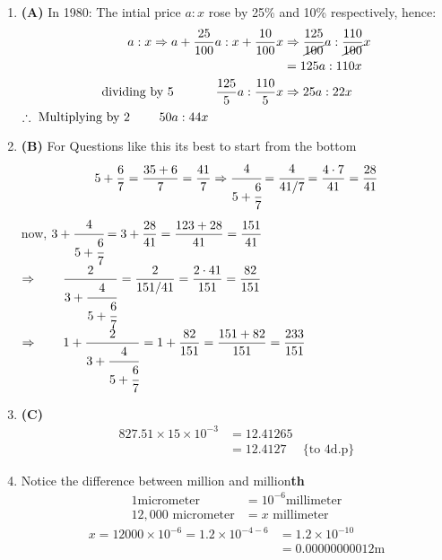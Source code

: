\begin{multicols}{2}
\begin{enumerate}[label={\textbf{\arabic*.}}]
    \item \textbf{(A)} In 1980: The intial price \(a : x\) rose by 25\% and 10\% respectively, hence: 
        \begin{align*}
        a:x \Rightarrow  a + \dfrac{25}{100}a : x + \dfrac{10}{100}x &\Rightarrow \dfrac{125}{\cancel{100}}a : \dfrac{110}{\cancel{100}}x \\ 
        &= {125}a : 110x \\
        \text{dividing by 5 } \hspace{30px} \dfrac{125}{5} a : \dfrac{110}{5} x  &\Rightarrow 25a : 22x 
    \end{align*}
    \(\therefore \text{ Multiplying by 2 } \hspace{20px}  50a : 44x \)

    \item \textbf{(B)} For Questions like this its best to start from the bottom \\
    \[5 + \dfrac{6}{7} = \dfrac{35 + 6}{7} = \dfrac{41}{7} \Rightarrow \cfrac{4}{5 + \cfrac{6}{7}} = \cfrac{4}{41/7} = \dfrac{4 \cdot 7}{41} = \dfrac{28}{41}\]
    now, \(3 + \cfrac{4}{5 + \cfrac{6}{7}} = 3 + \dfrac{28}{41} = \dfrac{123 + 28}{41} = \dfrac{151}{41} \)  \vspace{10pt} \\
    \(\Rightarrow \hspace{20px} \dfrac{2}{3 + \cfrac{4}{5 + \cfrac{6}{7}}} = \dfrac{2}{151/41} = \dfrac{2 \cdot 41}{151} = \dfrac{82}{151} \) \vspace{10pt} \\
    \(\Rightarrow \hspace{20px} 1 + \dfrac{2}{3 + \cfrac{4}{5 + \cfrac{6}{7}}} = 1 + \dfrac{82}{151} = \dfrac{151 + 82}{151} = \dfrac{233}{151} \)
    
    \item \textbf{(C)}\begin{align*}
        827.51 \times 15 \times 10^{-3} &= 12.41265 \\
        &= 12.4127  &\text{\{ to 4d.p\}}
        \end{align*}
    \item Notice the difference between million and million\textbf{th} 
    \begin{align*}
     1 \text{micrometer} &= 10^{-6}\text{millimeter} \\
    12,000 \text{ micrometer} &= x \text{ millimeter} 
    \end{align*}
    \begin{align*}
    x = 12000 \times 10^{-6}  = 1.2 \times 10^{-4 -6 } &= 1.2 \times 10^{-10} \\ &= 0.00000000012 \text{m}
    \end{align*}


\end{enumerate}
\end{multicols}
